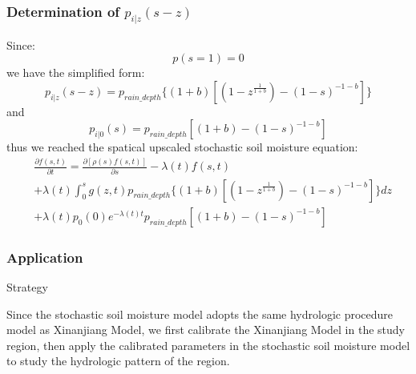\documentclass{beamer}
\begin{document}
\begin{frame}
\frametitle{Determination of $p_{i|z}(s-z)$}
Since:
\begin{equation}
p(s=1)=0
\end{equation}
we have the simplified form:
\begin{equation}
p_{i|z}(s-z)=p_{rain\_depth} \lbrace(1+b)[(1-z^{\frac{1}{1+b}})-(1-s)^{-1-b}]\rbrace
\end{equation}
and
\begin{equation}
p_{i|0}(s)=p_{rain\_depth} [(1+b)-(1-s)^{-1-b}]
\end{equation}
thus we reached the spatical upscaled stochastic soil moisture equation:
 \begin{equation}
 \begin{split}
 &\frac{\partial{f(s,t)}}{\partial t}=\frac{\partial{[\rho(s)f(s,t)]}}{\partial s}-\lambda(t)f(s,t)\\&+\lambda(t)\int_{0}^{s} g(z,t)p_{rain\_depth} \lbrace(1+b)[(1-z^{\frac{1}{1+b}})-(1-s)^{-1-b}]\rbrace dz\\&+\lambda(t)p_0(0)e^{-\lambda(t) t}p_{rain\_depth} [(1+b)-(1-s)^{-1-b}]
 \end{split}
 \end{equation}


\end{frame}
\begin{frame}
\frametitle{Application}
\begin{center}
Strategy
\end{center}
Since the stochastic soil moisture model adopts the same hydrologic procedure model as Xinanjiang Model, we first calibrate the Xinanjiang Model in the study region, then apply the calibrated parameters in the stochastic soil moisture model to study the hydrologic pattern of the region.
\end{frame}

\begin{frame}
\frametitle{Technical Philosophic Thinkin
\end{frame}
\end{document}
